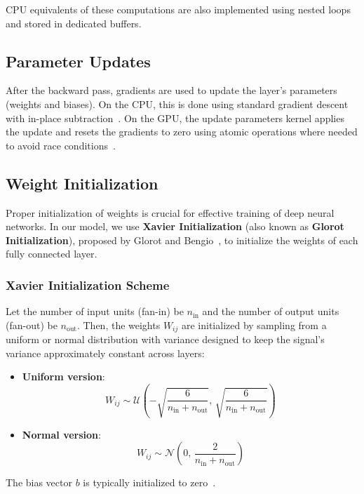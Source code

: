 CPU equivalents of these computations are also implemented using nested loops and stored in dedicated buffers.

\subsection{Parameter Updates}

After the backward pass, gradients are used to update the layer's parameters (weights and biases). On the CPU, this is done using standard gradient descent with in-place subtraction~\cite{goodfellow2016deep}. On the GPU, the update parameters kernel applies the update and resets the gradients to zero using atomic operations where needed to avoid race conditions~\cite{nvidia_cudnn, digitalocean_gpu_opt}.

\subsection{Weight Initialization}

Proper initialization of weights is crucial for effective training of deep neural networks. In our model, we use \textbf{Xavier Initialization} (also known as \textbf{Glorot Initialization}), proposed by Glorot and Bengio~\cite{glorot2010understanding}, to initialize the weights of each fully connected layer.

\subsubsection*{Xavier Initialization Scheme}

Let the number of input units (fan-in) be \( n_{\text{in}} \) and the number of output units (fan-out) be \( n_{\text{out}} \). Then, the weights \( W_{ij} \) are initialized by sampling from a uniform or normal distribution with variance designed to keep the signal's variance approximately constant across layers:

\begin{itemize}
    \item \textbf{Uniform version}:
    \[
        W_{ij} \sim \mathcal{U} \left( -\sqrt{\frac{6}{n_{\text{in}} + n_{\text{out}}}}, \, \sqrt{\frac{6}{n_{\text{in}} + n_{\text{out}}}} \right)
    \]
    \item \textbf{Normal version}:
    \[
        W_{ij} \sim \mathcal{N} \left( 0, \, \frac{2}{n_{\text{in}} + n_{\text{out}}} \right)
    \]
\end{itemize}

The bias vector \( b \) is typically initialized to zero~\cite{glorot2010understanding}.

